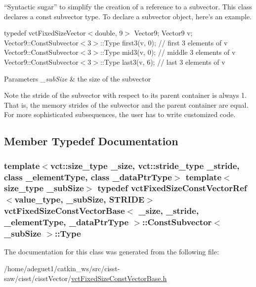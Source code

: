 ``\-Syntactic sugar'' to simplify the creation of a reference to a subvector. This class declares a const subvector type. To declare a subvector object, here's an example.

typedef vct\-Fixed\-Size\-Vector$<$double, 9$>$ Vector9; Vector9 v; Vector9\-::\-Const\-Subvector$<$3$>$\-::\-Type first3(v, 0); // first 3 elements of v Vector9\-::\-Const\-Subvector$<$3$>$\-::\-Type mid3(v, 0); // middle 3 elements of v Vector9\-::\-Const\-Subvector$<$3$>$\-::\-Type last3(v, 6); // last 3 elements of v


\begin{DoxyParams}{Parameters}
{\em \-\_\-sub\-Size} & the size of the subvector\\
\hline
\end{DoxyParams}
\begin{DoxyNote}{Note}
the stride of the subvector with respect to its parent container is always 1. That is, the memory strides of the subvector and the parent container are equal. For more sophisticated subsequences, the user has to write customized code. 
\end{DoxyNote}


\subsection{Member Typedef Documentation}
\hypertarget{classvct_fixed_size_const_vector_base_1_1_const_subvector_abe0d01ccc90fb2baf14abd8706c8de68}{
\subsubsection[{Type}]{\setlength{\rightskip}{0pt plus 5cm}template$<$vct\-::size\-\_\-type \-\_\-size, vct\-::stride\-\_\-type \-\_\-stride, class \-\_\-element\-Type, class \-\_\-data\-Ptr\-Type$>$ template$<$size\-\_\-type \-\_\-sub\-Size$>$ typedef {\bf vct\-Fixed\-Size\-Const\-Vector\-Ref}$<$value\-\_\-type, \-\_\-sub\-Size, {\bf S\-T\-R\-I\-D\-E}$>$ {\bf vct\-Fixed\-Size\-Const\-Vector\-Base}$<$ \-\_\-size, \-\_\-stride, \-\_\-element\-Type, \-\_\-data\-Ptr\-Type $>$\-::{\bf Const\-Subvector}$<$ \-\_\-sub\-Size $>$\-::{\bf Type}}}\label{classvct_fixed_size_const_vector_base_1_1_const_subvector_abe0d01ccc90fb2baf14abd8706c8de68}


The documentation for this class was generated from the following file\-:\begin{DoxyCompactItemize}
\item 
/home/adeguet1/catkin\-\_\-ws/src/cisst-\/saw/cisst/cisst\-Vector/\hyperlink{vct_fixed_size_const_vector_base_8h}{vct\-Fixed\-Size\-Const\-Vector\-Base.\-h}\end{DoxyCompactItemize}
